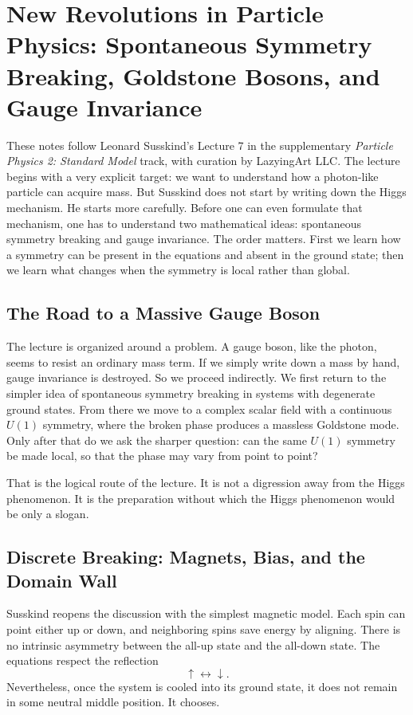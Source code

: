 \chapter{New Revolutions in Particle Physics: Spontaneous Symmetry Breaking, Goldstone Bosons, and Gauge Invariance}

These notes follow Leonard Susskind's Lecture 7 in the supplementary \emph{Particle Physics 2: Standard Model} track, with curation by LazyingArt LLC. The lecture begins with a very explicit target: we want to understand how a photon-like particle can acquire mass. But Susskind does not start by writing down the Higgs mechanism. He starts more carefully. Before one can even formulate that mechanism, one has to understand two mathematical ideas: spontaneous symmetry breaking and gauge invariance. The order matters. First we learn how a symmetry can be present in the equations and absent in the ground state; then we learn what changes when the symmetry is local rather than global.

\section{The Road to a Massive Gauge Boson}

The lecture is organized around a problem. A gauge boson, like the photon, seems to resist an ordinary mass term. If we simply write down a mass by hand, gauge invariance is destroyed. So we proceed indirectly. We first return to the simpler idea of spontaneous symmetry breaking in systems with degenerate ground states. From there we move to a complex scalar field with a continuous \(U(1)\) symmetry, where the broken phase produces a massless Goldstone mode. Only after that do we ask the sharper question: can the same \(U(1)\) symmetry be made local, so that the phase may vary from point to point?

That is the logical route of the lecture. It is not a digression away from the Higgs phenomenon. It is the preparation without which the Higgs phenomenon would be only a slogan.

\section{Discrete Breaking: Magnets, Bias, and the Domain Wall}

Susskind reopens the discussion with the simplest magnetic model. Each spin can point either up or down, and neighboring spins save energy by aligning. There is no intrinsic asymmetry between the all-up state and the all-down state. The equations respect the reflection
\[
\uparrow \longleftrightarrow \downarrow.
\]
Nevertheless, once the system is cooled into its ground state, it does not remain in some neutral middle position. It chooses.

